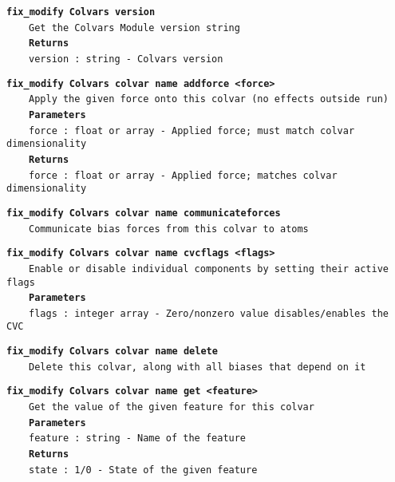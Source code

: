 \begin{mdexampleinput}{}
\texttt{\textbf{fix\_modify Colvars version}}
\\
\-~~~~\texttt{Get the Colvars Module version string}
\\
\-~~~~\texttt{\textbf{Returns}}
\\
\-~~~~\texttt{version : string - Colvars version}
\end{mdexampleinput}
\begin{mdexampleinput}{}
\texttt{\textbf{fix\_modify Colvars colvar name addforce <force>}}
\\
\-~~~~\texttt{Apply the given force onto this colvar (no effects outside run)}
\\
\-~~~~\texttt{\textbf{Parameters}}
\\
\-~~~~\texttt{force : float or array - Applied force; must match colvar dimensionality}
\\
\-~~~~\texttt{\textbf{Returns}}
\\
\-~~~~\texttt{force : float or array - Applied force; matches colvar dimensionality}
\end{mdexampleinput}
\begin{mdexampleinput}{}
\texttt{\textbf{fix\_modify Colvars colvar name communicateforces}}
\\
\-~~~~\texttt{Communicate bias forces from this colvar to atoms}
\end{mdexampleinput}
\begin{mdexampleinput}{}
\texttt{\textbf{fix\_modify Colvars colvar name cvcflags <flags>}}
\\
\-~~~~\texttt{Enable or disable individual components by setting their active flags}
\\
\-~~~~\texttt{\textbf{Parameters}}
\\
\-~~~~\texttt{flags : integer array - Zero/nonzero value disables/enables the CVC}
\end{mdexampleinput}
\begin{mdexampleinput}{}
\texttt{\textbf{fix\_modify Colvars colvar name delete}}
\\
\-~~~~\texttt{Delete this colvar, along with all biases that depend on it}
\end{mdexampleinput}
\begin{mdexampleinput}{}
\texttt{\textbf{fix\_modify Colvars colvar name get <feature>}}
\\
\-~~~~\texttt{Get the value of the given feature for this colvar}
\\
\-~~~~\texttt{\textbf{Parameters}}
\\
\-~~~~\texttt{feature : string - Name of the feature}
\\
\-~~~~\texttt{\textbf{Returns}}
\\
\-~~~~\texttt{state : 1/0 - State of the given feature}
\end{mdexampleinput}
